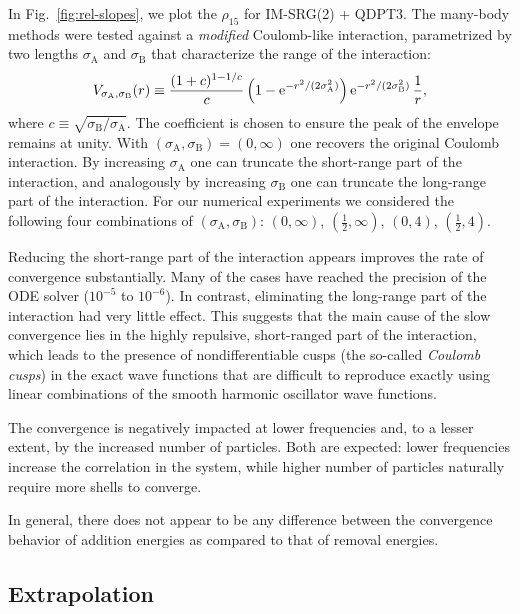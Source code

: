 In Fig.~\ref{fig:rel-slopes}, we plot the $\rho_{15}$ for IM-SRG(2) +
QDPT3.  The many-body methods were tested against a \emph{modified}
Coulomb-like interaction, parametrized by two lengths
$\sigma_{\mathrm{A}}$ and $\sigma_{\mathrm{B}}$ that characterize the
range of the interaction:
\begin{align}
  V_{\sigma_{\mathrm{A}}, \sigma_{\mathrm{B}}}(r) \equiv \frac{(1 + c)^{1 - 1/c}}{c} \left(1 - \operatorname{e}^{-r^2 / (2 \sigma_{\mathrm{A}}^2)}\right) \operatorname{e}^{-r^2 / (2 \sigma_{\mathrm{B}}^2)} \frac{1}{r},
\end{align}
where $c \equiv \sqrt{\sigma_{\mathrm{B}} / \sigma_{\mathrm{A}}}$.
The coefficient is chosen to ensure the peak of the envelope remains
at unity.  With $(\sigma_{\mathrm{A}}, \sigma_{\mathrm{B}}) =
(0, \infty)$ one recovers the original Coulomb interaction.  By
increasing $\sigma_{\mathrm{A}}$ one can truncate the short-range part
of the interaction, and analogously by increasing
$\sigma_{\mathrm{B}}$ one can truncate the long-range part of the
interaction.  For our numerical experiments we considered the
following four combinations of
$(\sigma_{\mathrm{A}}, \sigma_{\mathrm{B}})$: $(0, \infty)$,
$(\frac{1}{2}, \infty)$, $(0, 4)$, $(\frac{1}{2}, 4)$.

Reducing the short-range part of the interaction appears improves the rate
of convergence substantially.  Many of the cases have reached the
precision of the ODE solver ($10^{-5}$ to $10^{-6}$).  In contrast,
eliminating the long-range part of the interaction had very little
effect.  This suggests that the main cause of the slow convergence
lies in the highly repulsive, short-ranged part of the interaction,
which leads to the presence of nondifferentiable cusps (the
so-called \textit{Coulomb cusps}) in the exact wave functions that are
difficult to reproduce exactly using linear combinations of the smooth
harmonic oscillator wave functions.

The convergence is negatively impacted at lower frequencies and, to a
lesser extent, by the increased number of particles.  Both are
expected: lower frequencies increase the correlation in the system,
while higher number of particles naturally require more shells to
converge.

In general, there does not appear to be any difference between the
convergence behavior of addition energies as compared to that of
removal energies.

\subsection{Extrapolation}
\label{subsec:extrapolation}

